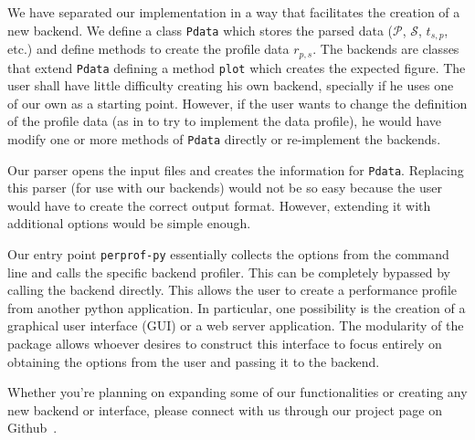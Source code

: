 We have separated our implementation in a way that facilitates the creation of a
new backend.
We define a class {\tt Pdata} which stores the parsed data ($\mathcal{P}$,
$\mathcal{S}$, $t_{s,p}$, etc.) and define methods to create the profile data
$r_{p,s}$.
The backends are classes that extend {\tt Pdata} defining a method {\tt plot}
which creates the expected figure.
The user shall have little difficulty creating his own backend, specially if he
uses one of our own as a starting point.
However, if the user wants to change the definition of the profile data (as in
to try to implement the data profile), he would have modify
one or more methods of {\tt Pdata}
directly or re-implement the backends.

Our parser opens the input files and creates the information for {\tt Pdata}.
Replacing this parser (for use with our backends) would not be so easy
because the user would have to create the correct output format.  However,
extending it with additional options would be simple enough.

Our entry point {\tt perprof-py} essentially collects the options from the command
line and calls the specific backend profiler. This can be completely bypassed
by calling the backend directly. This allows the user to create a performance
profile from another python application. In particular, one possibility is the
creation of a graphical user interface (GUI)
or a web server application. The modularity of the package
allows whoever desires to construct this interface to focus entirely on
obtaining the options from the user and passing it to the backend.

Whether you're planning on expanding some of our functionalities or creating any
new backend or interface, please connect with us through our project page on
Github~\cite{url:perprof-py}.

